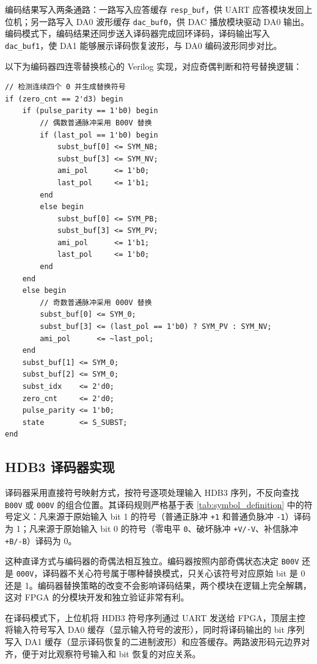 \documentclass[UTF8,a4paper,12pt]{ctexart}
\begin{document}
编码结果写入两条通路：一路写入应答缓存 \texttt{resp\_buf}，供 UART 应答模块发回上位机；另一路写入 DA0 波形缓存 \texttt{dac\_buf0}，供 DAC 播放模块驱动 DA0 输出。编码模式下，编码结果还同步送入译码器完成回环译码，译码输出写入 \texttt{dac\_buf1}，使 DA1 能够展示译码恢复波形，与 DA0 编码波形同步对比。

以下为编码器四连零替换核心的 Verilog 实现，对应奇偶判断和符号替换逻辑：

\begin{lstlisting}[style=VerilogStyle,caption={FPGA HDB3 四连零替换核心},label={lst:encoder_core}]
// 检测连续四个 0 并生成替换符号
if (zero_cnt == 2'd3) begin
    if (pulse_parity == 1'b0) begin
        // 偶数普通脉冲采用 B00V 替换
        if (last_pol == 1'b0) begin
            subst_buf[0] <= SYM_NB;
            subst_buf[3] <= SYM_NV;
            ami_pol      <= 1'b0;
            last_pol     <= 1'b1;
        end
        else begin
            subst_buf[0] <= SYM_PB;
            subst_buf[3] <= SYM_PV;
            ami_pol      <= 1'b1;
            last_pol     <= 1'b0;
        end
    end
    else begin
        // 奇数普通脉冲采用 000V 替换
        subst_buf[0] <= SYM_0;
        subst_buf[3] <= (last_pol == 1'b0) ? SYM_PV : SYM_NV;
        ami_pol      <= ~last_pol;
    end
    subst_buf[1] <= SYM_0;
    subst_buf[2] <= SYM_0;
    subst_idx    <= 2'd0;
    zero_cnt     <= 2'd0;
    pulse_parity <= 1'b0;
    state        <= S_SUBST;
end
\end{lstlisting}

\subsection{HDB3 译码器实现}

译码器采用直接符号映射方式，按符号逐项处理输入 HDB3 序列，不反向查找 \texttt{B00V} 或 \texttt{000V} 的组合位置。其译码规则严格基于表 \ref{tab:symbol_definition} 中的符号定义：凡来源于原始输入 bit 1 的符号（普通正脉冲 \texttt{+1} 和普通负脉冲 \texttt{-1}）译码为 1；凡来源于原始输入 bit 0 的符号（零电平 \texttt{0}、破坏脉冲 \texttt{+V/-V}、补信脉冲 \texttt{+B/-B}）译码为 0。

这种直译方式与编码器的奇偶法相互独立。编码器按照内部奇偶状态决定 \texttt{B00V} 还是 \texttt{000V}，译码器不关心符号属于哪种替换模式，只关心该符号对应原始 bit 是 0 还是 1。编码器替换策略的改变不会影响译码结果，两个模块在逻辑上完全解耦，这对 FPGA 的分模块开发和独立验证非常有利。

在译码模式下，上位机将 HDB3 符号序列通过 UART 发送给 FPGA，顶层主控将输入符号写入 DA0 缓存（显示输入符号的波形），同时将译码输出的 bit 序列写入 DA1 缓存（显示译码恢复的二进制波形）和应答缓存。两路波形码元边界对齐，便于对比观察符号输入和 bit 恢复的对应关系。
\end{document}
